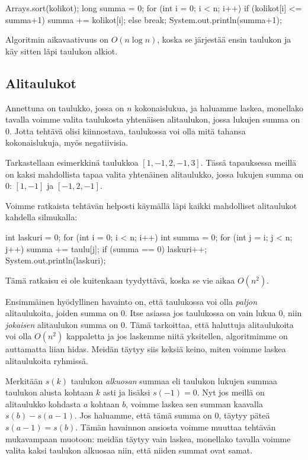\begin{code}
Arrays.sort(kolikot);
long summa = 0;
for (int i = 0; i < n; i++) {
    if (kolikot[i] <= summa+1) {
        summa += kolikot[i];
    } else {
        break;
    }
}
System.out.println(summa+1);
\end{code}

Algoritmin aikavaativuus on $O(n \log n)$, koska se
järjestää ensin taulukon ja käy sitten läpi taulukon alkiot.

\subsection{Alitaulukot}

Annettuna on taulukko, jossa on $n$ kokonaislukua,
ja haluamme laskea, monellako tavalla voimme valita
taulukosta yhtenäisen alitaulukon, jossa lukujen summa on $0$.
Jotta tehtävä olisi kiinnostava, taulukossa voi olla
mitä tahansa kokonaislukuja, myös negatiivisia.

Tarkastellaan esimerkkinä taulukkoa $[1,-1,2,-1,3]$.
Tässä tapauksessa meillä on kaksi mahdollista tapaa
valita yhtenäinen alitaulukko, jossa lukujen summa on $0$:
$[1,-1]$ ja $[-1,2,-1]$.

Voimme ratkaista tehtävän helposti käymällä läpi
kaikki mahdolliset alitaulukot kahdella silmukalla:

\begin{code}
int laskuri = 0;
for (int i = 0; i < n; i++) {
    int summa = 0;
    for (int j = i; j < n; j++) {
        summa += taulu[j];
        if (summa == 0) laskuri++;
    }
}
System.out.println(laskuri);
\end{code}

Tämä ratkaisu ei ole kuitenkaan tyydyttävä,
koska se vie aikaa $O(n^2)$.

Ensimmäinen hyödyllinen havainto on,
että taulukossa voi olla \emph{paljon} alitaulukoita,
joiden summa on $0$.
Itse asiassa jos taulukossa on vain lukua $0$,
niin \emph{jokaisen} alitaulukon summa on $0$.
Tämä tarkoittaa, että haluttuja alitaulukoita voi olla
$O(n^2)$ kappaletta ja jos laskemme niitä yksitellen,
algoritmimme on auttamatta liian hidas.
Meidän täytyy siis keksiä keino, miten voimme laskea
alitaulukoita ryhmissä.

Merkitään $s(k)$ taulukon \emph{alkuosan} summaa
eli taulukon lukujen summaa taulukon alusta kohtaan $k$ asti
ja lisäksi $s(-1)=0$.
Nyt jos meillä on alitaulukko kohdasta $a$ kohtaan $b$,
voimme laskea sen summan kaavalla $s(b)-s(a-1)$.
Jos haluamme, että tämä summa on $0$, täytyy päteä
$s(a-1)=s(b)$.
Tämän havainnon ansiosta voimme muuttaa tehtävän
mukavampaan muotoon: meidän täytyy vain laskea,
monellako tavalla voimme valita kaksi taulukon alkuosaa
niin, että niiden summat ovat samat.

